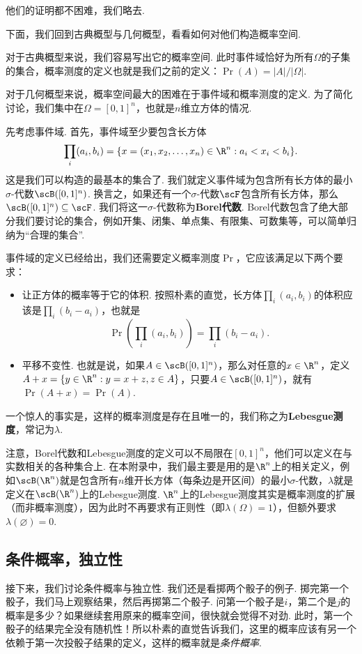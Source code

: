 他们的证明都不困难，我们略去. 

下面，我们回到古典概型与几何概型，看看如何对他们构造概率空间.  

对于古典概型来说，我们容易写出它的概率空间. 此时事件域恰好为所有$\Omega$的子集的集合，概率测度的定义也就是我们之前的定义：$\Pr(A)=|A|/|\Omega|$. 

对于几何概型来说，概率空间最大的困难在于事件域和概率测度的定义. 为了简化讨论，我们集中在$\Omega=[0,1]^n$，也就是$n$维立方体的情况. 

先考虑事件域. 首先，事件域至少要包含长方体
\[\prod_i(a_i,b_i)=\{x=(x_1,x_2,\ldots,x_n)\in\R^n:a_i<x_i<b_i\}.\]
这是我们可以构造的最基本的集合了. 我们就定义事件域为包含所有长方体的最小$\sigma$-代数$\scB([0,1]^n)$. 换言之，如果还有一个$\sigma$-代数$\scF$包含所有长方体，那么$\scB([0,1]^n)\subseteq\scF$. 我们将这一$\sigma$-代数称为\textbf{Borel代数}. Borel代数包含了绝大部分我们要讨论的集合，例如开集、闭集、单点集、有限集、可数集等，可以简单归纳为“合理的集合”. 

事件域的定义已经给出，我们还需要定义概率测度$\Pr$，它应该满足以下两个要求：
\begin{itemize}
    \item 让正方体的概率等于它的体积. 按照朴素的直觉，长方体$\prod_i(a_i,b_i)$的体积应该是$\prod_i(b_i-a_i)$，也就是
    \[
        \Pr\left(\prod_i(a_i,b_i)\right) = \prod_i(b_i-a_i).
    \]
    \item 平移不变性. 也就是说，如果$A\in\scB([0,1]^n)$，那么对任意的$x\in\R^n$，定义$A+x=\{y\in\R^n:y=x+z,z\in A\}$，只要$A\in\scB([0,1]^n)$，就有$\Pr(A+x)=\Pr(A)$.
\end{itemize}
一个惊人的事实是，这样的概率测度是存在且唯一的，我们称之为\textbf{Lebesgue测度}，常记为$\lambda$.

注意，Borel代数和Lebesgue测度的定义可以不局限在$[0,1]^n$，他们可以定义在与实数相关的各种集合上. 在本附录中，我们最主要是用的是$\R^n$上的相关定义，例如$\scB(\R^n)$就是包含所有$n$维开长方体（每条边是开区间）的最小$\sigma$-代数，$\lambda$就是定义在$\scB(\R^n)$上的Lebesgue测度. $\R^n$上的Lebesgue测度其实是概率测度的扩展（而非概率测度），因为此时不再要求有正则性（即$\lambda(\Omega)=1$），但额外要求$\lambda(\varnothing)=0$.

\subsection{条件概率，独立性}
接下来，我们讨论条件概率与独立性. 我们还是看掷两个骰子的例子. 掷完第一个骰子，我们马上观察结果，然后再掷第二个骰子. 问第一个骰子是$i$，第二个是$j$的概率是多少？如果继续套用原来的概率空间，很快就会觉得不对劲. 此时，第一个骰子的结果完全没有随机性！所以朴素的直觉告诉我们，这里的概率应该有另一个依赖于第一次投骰子结果的定义，这样的概率就是\emph{条件概率}. 

